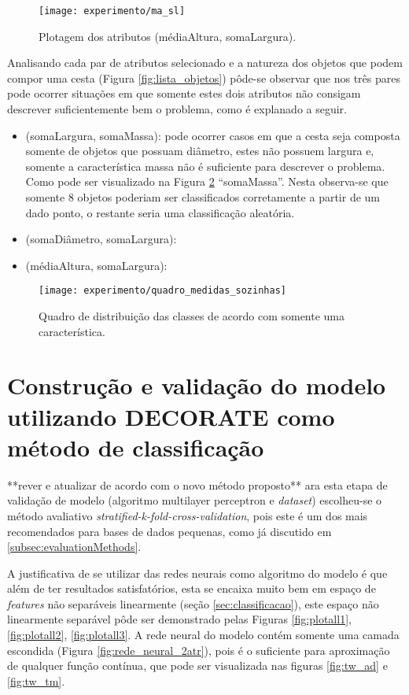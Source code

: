 \begin{figure}[!htb] \centering 
  \centering
  \texttt{[image: experimento/ma\_sl]} 
  \caption{Plotagem dos atributos (médiaAltura, somaLargura). } 
  \label{fig:ma_sl}
\end{figure}

Analisando cada par de atributos selecionado e a natureza dos objetos que podem compor uma cesta (Figura \ref{fig:lista_objetos}) pôde-se observar que nos três pares pode ocorrer situações em que somente estes dois atributos não consigam descrever suficientemente bem o problema, como é explanado a seguir.

\begin{itemize}
\item (somaLargura, somaMassa): pode ocorrer casos em que a cesta seja composta somente de objetos que possuam diâmetro, estes não possuem largura e, somente a característica massa não é suficiente para descrever o problema. Como pode ser visualizado na Figura \ref{fig:quadro_medidas_sozinhas} ``somaMassa''. Nesta observa-se que somente 8 objetos poderiam ser classificados corretamente a partir de um dado ponto, o restante seria uma classificação aleatória.
\item (somaDiâmetro, somaLargura):
\item (médiaAltura, somaLargura):
\end{itemize}

\begin{figure}[!htb] \centering 
  \centering
  \texttt{[image: experimento/quadro\_medidas\_sozinhas]} 
  \caption{Quadro de distribuição das classes de acordo com somente uma característica.} 
  \label{fig:quadro_medidas_sozinhas}
\end{figure}

\section{Construção e validação do modelo utilizando DECORATE como método de classificação}
\label{sec:constvalidacao}**rever e atualizar de acordo com o novo método proposto**
ara esta etapa de validação de modelo (algoritmo multilayer perceptron e \textit{dataset}) escolheu-se o método avaliativo \textit{stratified-k-fold-cross-validation}, pois este é um dos mais recomendados para bases de dados pequenas, como já discutido em \ref{subsec:evaluationMethods}. 

A justificativa de se utilizar das redes neurais como algoritmo do modelo é que além de ter resultados satisfatórios, esta se encaixa muito bem em espaço de \textit{features} não separáveis linearmente (seção \ref{sec:classificacao}), este espaço não linearmente separável pôde ser demonstrado pelas Figuras \ref{fig:plotall1}, \ref{fig:plotall2}, \ref{fig:plotall3}. A rede neural do modelo contém somente uma camada escondida (Figura \ref{fig:rede_neural_2atr}), pois é o suficiente para aproximação de qualquer função contínua\cite{Pasini:2015}, que pode ser visualizada nas figuras \ref{fig:tw_ad} e \ref{fig:tw_tm}.

